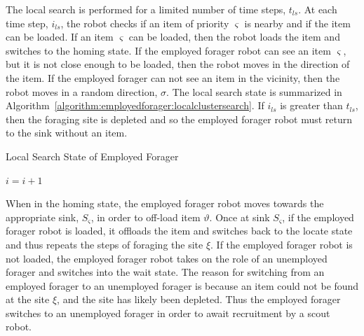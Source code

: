 \documentclass[preprint,12pt]{elsarticle}
\begin{document}
The local search is performed for a limited number of time steps, $t_{ls}$. At each time step, $i_{ls}$, the robot checks if an item of priority $\varsigma$ is nearby and if the item can be loaded. If an item $\varsigma$ can be loaded, then the robot loads the item and switches to the homing state. If the employed forager robot can see an item $\varsigma$, but it is not close enough to be loaded, then the robot moves in the direction of the item. If the employed forager can not see an item in the vicinity, then the robot moves in a random direction, $\sigma$. The local search state is summarized in Algorithm~\ref{algorithm:employedforager:localclustersearch}. If $i_{ls}$ is greater than $t_{ls}$, then the foraging site is depleted and so the employed forager robot must return to the sink without an item.

\begin{algorithm}
\caption{Local Search State of Employed Forager}
\label{algorithm:employedforager:localclustersearch}
\begin{algorithmic}[1]
			\State {}
			\State {}
			\State {}
		\Else
			\State {}
			\State {}	
		\EndIf
\Else
\EndIf
\State $i =i + 1$
\EndFunction
\end{algorithmic}
\end{algorithm}

When in the homing state, the employed forager robot moves towards the appropriate sink, $S_\varsigma$, in order to off-load item $\vartheta$. Once at sink $S_\varsigma$, if the employed forager robot is loaded, it offloads the item and switches back to the locate state and thus repeats the steps of foraging the site $\xi$. If the employed forager robot is not loaded, the employed forager robot takes on the role of an unemployed forager and switches into the wait state. The reason for switching from an employed forager to an unemployed forager is because an item could not be found at the site $\xi$, and the site has likely been depleted. Thus the employed forager switches to an unemployed forager in order to await recruitment by a scout robot.
\end{document}
